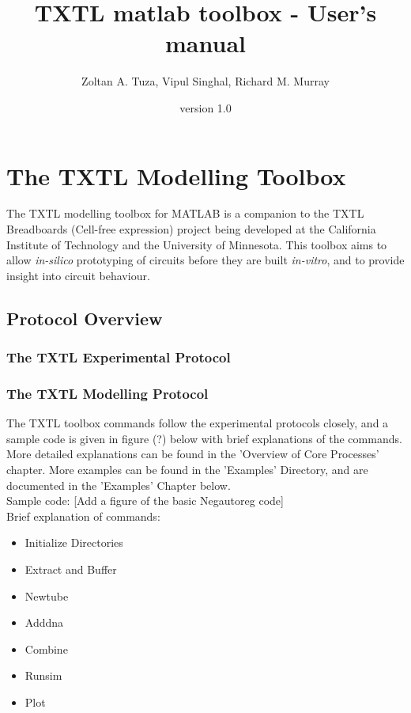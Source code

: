 \documentclass[english]{report}
\begin{document}
\title{TXTL matlab toolbox - User's manual}
\date{version 1.0}
\author{Zoltan A. Tuza, Vipul Singhal, Richard M. Murray}
\maketitle
\tableofcontents

\chapter{The TXTL Modelling Toolbox}

The TXTL modelling toolbox for MATLAB is a companion to the TXTL Breadboards (Cell-free expression) project being developed at the California Institute of Technology and the University of Minnesota. This toolbox aims to allow \textit{in-silico} prototyping of circuits before they are built \textit{in-vitro}, and to provide insight into circuit behaviour. 

	\section{Protocol Overview}

		\subsection{The TXTL Experimental Protocol}
		\subsection{The TXTL Modelling Protocol}
		The TXTL toolbox commands follow the experimental protocols closely, and a sample code is given in figure (?) below with brief explanations of the commands. More detailed explanations can be found in the 'Overview of Core Processes' chapter. More examples can be found in the 'Examples' Directory, and are documented in the 'Examples' Chapter below. \\

\noindent Sample code:
[Add a figure of the basic Negautoreg code] \\

\noindent Brief explanation of commands:
\begin{itemize}
	\item Initialize Directories
	\item Extract and Buffer
	\item Newtube
	\item Adddna
	\item Combine
	\item Runsim
	\item Plot
\end{itemize}
\end{document}
